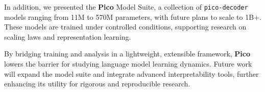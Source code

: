 In addition, we presented the \textbf{Pico} Model Suite, a collection of \texttt{pico-decoder} models ranging from 11M to 570M parameters, with future plans to scale to 1B+. These models are trained under controlled conditions, supporting research on scaling laws and representation learning.

By bridging training and analysis in a lightweight, extensible framework, \textbf{Pico} lowers the barrier for studying language model learning dynamics. Future work will expand the model suite and integrate advanced interpretability tools, further enhancing its utility for rigorous and reproducible research.





